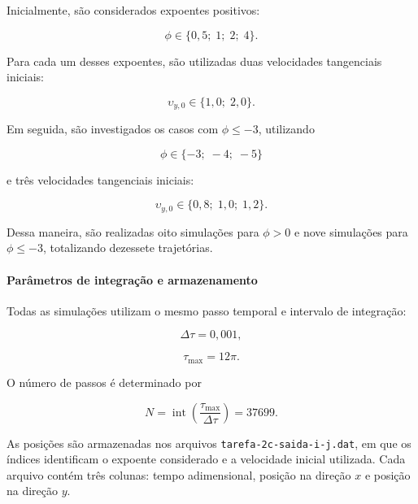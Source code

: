 \documentclass[12pt,a4paper]{article}
\begin{document}
Inicialmente, são considerados expoentes positivos:

\begin{equation}
    \phi\in\{0,5;\;1;\;2;\;4\}.
\end{equation}

Para cada um desses expoentes, são utilizadas duas velocidades tangenciais iniciais:

\begin{equation}
    \upsilon_{y,0}\in\{1,0;\;2,0\}.
\end{equation}

Em seguida, são investigados os casos com $\phi\leq -3$, utilizando

\begin{equation}
    \phi\in\{-3;\;-4;\;-5\}
\end{equation}

e três velocidades tangenciais iniciais:

\begin{equation}
    \upsilon_{y,0}\in\{0,8;\;1,0;\;1,2\}.
\end{equation}

Dessa maneira, são realizadas oito simulações para $\phi>0$ e nove simulações para $\phi\leq-3$, totalizando dezessete trajetórias.

\paragraph{Parâmetros de integração e armazenamento}

Todas as simulações utilizam o mesmo passo temporal e intervalo de integração:

\begin{equation}
    \Delta\tau=0,001,
\end{equation}

\begin{equation}
    \tau_{\max}=12\pi.
\end{equation}

O número de passos é determinado por

\begin{equation}
    N=\operatorname{int}
    \left(\frac{\tau_{\max}}{\Delta\tau}\right)
    =37699.
\end{equation}

As posições são armazenadas nos arquivos \texttt{tarefa-2c-saida-i-j.dat}, em que os índices identificam o expoente considerado e a velocidade inicial utilizada. Cada arquivo contém três colunas: tempo adimensional, posição na direção $x$ e posição na direção $y$.
\end{document}
